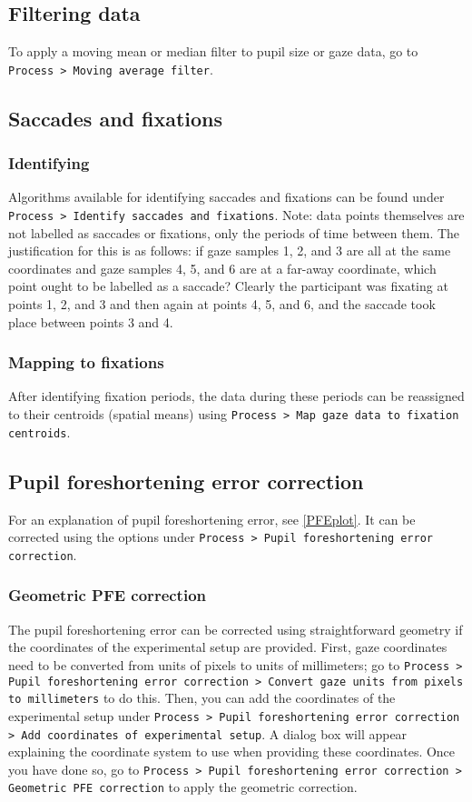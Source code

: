 \documentclass{article}
\begin{document}
\subsection{Filtering data}
To apply a moving mean or median filter to pupil size or gaze data, go to \texttt{Process > Moving average filter}.
\subsection{Saccades and fixations}
\subsubsection{Identifying}
Algorithms available for identifying saccades and fixations can be found under \texttt{Process > Identify saccades and fixations}. Note: data points themselves are not labelled as saccades or fixations, only the periods of time between them. The justification for this is as follows: if gaze samples 1, 2, and 3 are all at the same coordinates and gaze samples 4, 5, and 6 are at a far-away coordinate, which point ought to be labelled as a saccade? Clearly the participant was fixating at points 1, 2, and 3 and then again at points 4, 5, and 6, and the saccade took place between points 3 and 4.
\subsubsection{Mapping to fixations}
After identifying fixation periods, the data during these periods can be reassigned to their centroids (spatial means) using \texttt{Process > Map gaze data to fixation centroids}.
\subsection{Pupil foreshortening error correction} \label{PFEcorrection}
For an explanation of pupil foreshortening error, see \ref{PFEplot}. It can be corrected using the options under \texttt{Process > Pupil foreshortening error correction}.
\subsubsection{Geometric PFE correction} \label{coords_explanation}
The pupil foreshortening error can be corrected using straightforward geometry if the coordinates of the experimental setup are provided. First, gaze coordinates need to be converted from units of pixels to units of millimeters; go to \texttt{Process > Pupil foreshortening error correction > Convert gaze units from pixels to millimeters} to do this. Then, you can add the coordinates of the experimental setup under \texttt{Process > Pupil foreshortening error correction > Add coordinates of experimental setup}. A dialog box will appear explaining the coordinate system to use when providing these coordinates. Once you have done so, go to \texttt{Process > Pupil foreshortening error correction > Geometric PFE correction} to apply the geometric correction.
\end{document}
